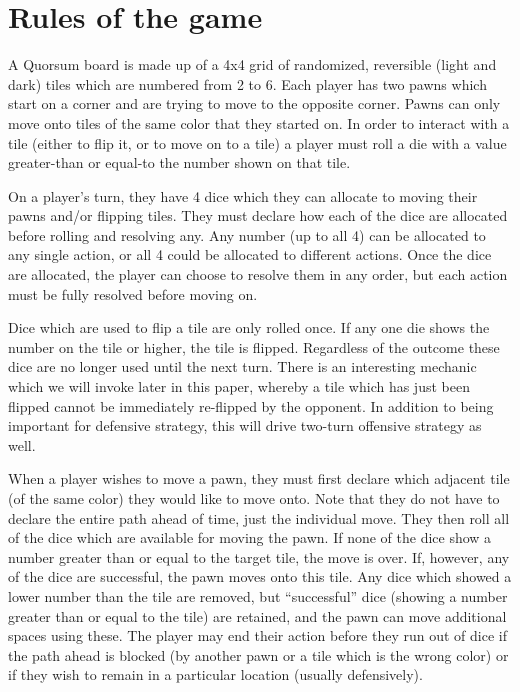 \documentclass[letterpaper,11pt]{article}
\begin{document}
\section{Rules of the game}
A Quorsum board is made up of a 4x4 grid of randomized, reversible (light and
dark) tiles which are numbered from 2 to 6.  Each player has two pawns which
start on a corner and are trying to move to the opposite corner.  Pawns can only
move onto tiles of the same color that they started on.  In order to
interact with a tile (either to flip it, or to move on to a tile) a player must
roll a die with a value greater-than or equal-to the number shown on that tile.

On a player's turn, they have 4 dice which they can allocate to moving their
pawns and/or flipping tiles.  They must declare how each of the dice are 
allocated before rolling and resolving any.  Any number (up to all 4) can be
allocated to any single action, or all 4 could be allocated to different
actions.  Once the dice are allocated, the player can choose to resolve them
in any order, but each action must be fully resolved before moving on.

Dice which are used to flip a tile are only rolled once.  If any one die shows
the number on the tile or higher, the tile is flipped.  Regardless of the
outcome these dice are no longer used until the next turn.  There is an
interesting mechanic which we will invoke later in this paper, whereby a tile
which has just been flipped cannot be immediately re-flipped by the opponent.
In addition to being important for defensive strategy, this will drive
two-turn offensive strategy as well.

When a player wishes to move a pawn, they must first declare which adjacent
tile (of the same color) they would like to move onto.  Note that they do not 
have to declare the entire path ahead of time, just the individual move.  They
then roll all of the dice which are available for moving the pawn.  If none of
the dice show a number greater than or equal to the target tile, the move is
over.  If, however, any of the dice are successful, the pawn moves onto this
tile.  Any dice which showed a lower number than the tile are removed, but
``successful'' dice (showing a number greater than or equal to the tile) are
retained, and the pawn can move additional spaces using these.  The player may
end their action before they run out of dice if the path ahead is blocked (by
another pawn or a tile which is the wrong color) or if they wish to remain in
a particular location (usually defensively).
\end{document}
